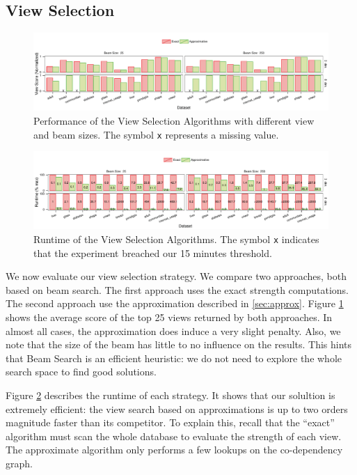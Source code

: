\subsection{View Selection}

\begin{figure}[t!]
\centering
\includegraphics[width=2\columnwidth]{plots/column-select-score}
\caption{Performance of the View Selection Algorithms with different view and
beam sizes. The symbol \texttt{x} represents a missing value.}
\label{pic:column-select-score}
\end{figure}
 
\begin{figure}[t!]
\centering
\includegraphics[width=2\columnwidth]{plots/column-select-time}
\caption{Runtime of the View Selection Algorithms. The symbol \texttt{x}
indicates that the experiment breached our 15 minutes threshold.} 
\label{pic:column-select-time}
\end{figure}

We now evaluate our view selection strategy. We compare two approaches, both
based on beam search. The first approach uses the exact strength computations.
The second approach use the approximation described in \ref{sec:approx}. Figure
\ref{pic:column-select-score} shows the average score of the top 25 views
returned by both approaches. In almost all cases, the approximation does induce
a very slight penalty. Also, we note that the size of the beam has little to no
influence on the results. This hints that Beam Search is an efficient
heuristic: we do not need to explore the whole search space to find good
solutions.

Figure \ref{pic:column-select-time} describes the runtime of each strategy. It
shows that our solultion is extremely efficient: the view search based on
approximations is up to two orders magnitude faster than its competitor. To
explain this, recall that the ``exact'' algorithm must scan the
whole database to evaluate the strength of each view. The approximate algorithm
only performs a few lookups on the co-dependency graph.

